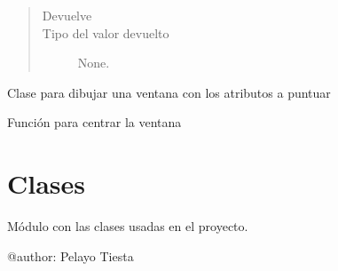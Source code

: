 \documentclass[letterpaper,10pt,spanish]{sphinxmanual}
\begin{document}
\begin{fulllineitems}
\begin{fulllineitems}
\begin{quote}
\begin{description}
\begin{itemize}
\end{itemize}

\item[{Devuelve}] \leavevmode
\sphinxAtStartPar


\item[{Tipo del valor devuelto}] \leavevmode
\sphinxAtStartPar
None.

\end{description}\end{quote}

\end{fulllineitems}


\end{fulllineitems}


\begin{fulllineitems}
\label{\detokenize{Funciones:Funciones.ventanaAtributosPersonales}}
\sphinxAtStartPar
Clase para dibujar una ventana con los atributos a puntuar

\begin{fulllineitems}
\label{\detokenize{Funciones:Funciones.ventanaAtributosPersonales.center}}
\sphinxAtStartPar
Función para centrar la ventana

\end{fulllineitems}


\end{fulllineitems}



\chapter{Clases}
\label{\detokenize{Clases:clases}}\label{\detokenize{Clases::doc}}
\sphinxAtStartPar
Módulo con las clases usadas en el proyecto.

\label{\detokenize{Clases:module-Clases}}
\sphinxAtStartPar
@author: Pelayo Tiesta
\end{document}
